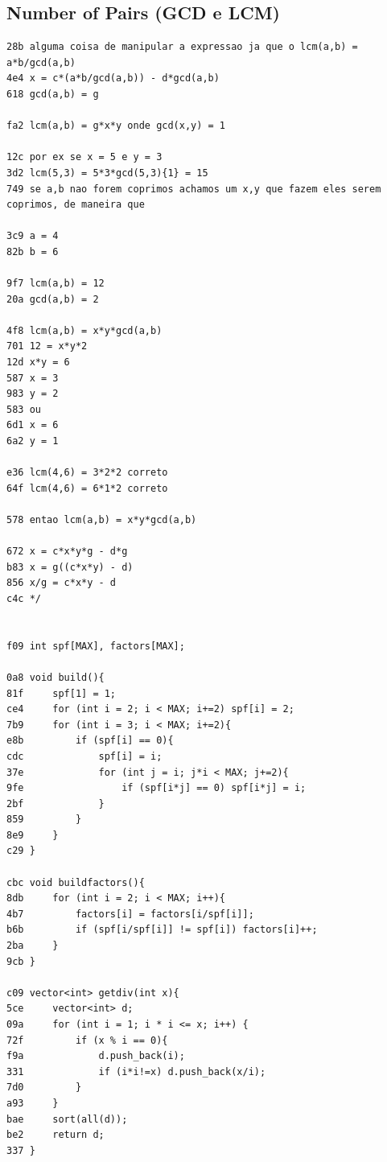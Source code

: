 \documentclass[11pt, a4paper, twoside]{article}
\begin{document}
\subsection{Number of Pairs (GCD e LCM)}
\begin{lstlisting}
28b alguma coisa de manipular a expressao ja que o lcm(a,b) = a*b/gcd(a,b)
4e4 x = c*(a*b/gcd(a,b)) - d*gcd(a,b)
618 gcd(a,b) = g
 
fa2 lcm(a,b) = g*x*y onde gcd(x,y) = 1
 
12c por ex se x = 5 e y = 3
3d2 lcm(5,3) = 5*3*gcd(5,3){1} = 15
749 se a,b nao forem coprimos achamos um x,y que fazem eles serem coprimos, de maneira que
 
3c9 a = 4
82b b = 6
 
9f7 lcm(a,b) = 12
20a gcd(a,b) = 2
 
4f8 lcm(a,b) = x*y*gcd(a,b)
701 12 = x*y*2
12d x*y = 6
587 x = 3
983 y = 2
583 ou 
6d1 x = 6
6a2 y = 1
 
e36 lcm(4,6) = 3*2*2 correto
64f lcm(4,6) = 6*1*2 correto
 
578 entao lcm(a,b) = x*y*gcd(a,b)
 
672 x = c*x*y*g - d*g
b83 x = g((c*x*y) - d)
856 x/g = c*x*y - d
c4c */
 
 
f09 int spf[MAX], factors[MAX];
 
0a8 void build(){
81f     spf[1] = 1;
ce4     for (int i = 2; i < MAX; i+=2) spf[i] = 2;
7b9     for (int i = 3; i < MAX; i+=2){
e8b         if (spf[i] == 0){
cdc             spf[i] = i;
37e             for (int j = i; j*i < MAX; j+=2){
9fe                 if (spf[i*j] == 0) spf[i*j] = i;
2bf             }
859         }
8e9     }
c29 }
 
cbc void buildfactors(){
8db     for (int i = 2; i < MAX; i++){
4b7         factors[i] = factors[i/spf[i]];
b6b         if (spf[i/spf[i]] != spf[i]) factors[i]++;
2ba     } 
9cb }
 
c09 vector<int> getdiv(int x){
5ce     vector<int> d;
09a     for (int i = 1; i * i <= x; i++) {
72f         if (x % i == 0){ 
f9a             d.push_back(i);
331             if (i*i!=x) d.push_back(x/i);
7d0         }
a93     }
bae     sort(all(d));
be2     return d;
337 }
 

\end{lstlisting}
\end{document}
